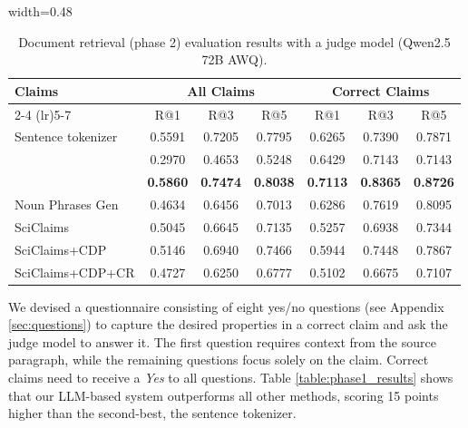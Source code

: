 \documentclass[11pt]{article}
\begin{document}
\begin{table}[ht]
\footnotesize
\centering
\begin{adjustbox}{width=0.48\textwidth}
\begin{tabular}{l ccc ccc}
\toprule
\multirow{2}{*}{Claims} & \multicolumn{3}{c}{All Claims} & \multicolumn{3}{c}{Correct Claims} \\ 
\cmidrule(lr){2-4} \cmidrule(lr){5-7}
 & R@1 & R@3 & R@5 & R@1 & R@3 & R@5 \\ \midrule
Sentence tokenizer & 0.5591 & 0.7205 & 0.7795 & 0.6265 & 0.7390 & 0.7871 \\
\cite{pan-etal-2021-zero} & 0.2970 & 0.4653 & 0.5248 & 0.6429 & 0.7143 & 0.7143 \\
\cite{wright-etal-2022-generating} & \textbf{0.5860} & \textbf{0.7474} & \textbf{0.8038} & \textbf{0.7113} & \textbf{0.8365} & \textbf{0.8726} \\
Noun Phrases Gen & 0.4634 & 0.6456 & 0.7013 & 0.6286 & 0.7619 & 0.8095 \\
\midrule
SciClaims & 0.5045 & 0.6645 & 0.7135 & 0.5257 & 0.6938 & 0.7344 \\
SciClaims+CDP & 0.5146 & 0.6940 & 0.7466 & 0.5944 & 0.7448 & 0.7867 \\
SciClaims+CDP+CR & 0.4727 & 0.6250 & 0.6777 & 0.5102 & 0.6675 & 0.7107 \\
\bottomrule
\end{tabular}
\end{adjustbox}
\caption{Document retrieval (phase 2) evaluation results  with a judge model (Qwen2.5 72B AWQ).}
\label{table:phase2_results}
\end{table}

We devised a questionnaire consisting of eight yes/no questions (see Appendix \ref{sec:questions}) to capture the desired properties in a correct claim and ask the judge model to answer it. The first question requires context from the source paragraph, while the remaining questions focus solely on the claim. Correct claims need to receive a \textit{Yes} to all questions. Table \ref{table:phase1_results} shows that our LLM-based system outperforms all other methods, scoring 15 points higher than the second-best, the sentence tokenizer.
\end{document}
